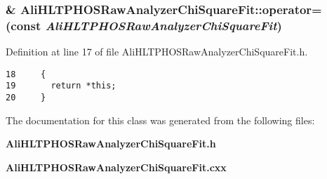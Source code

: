 \subsubsection{\& Ali\-HLTPHOSRaw\-Analyzer\-Chi\-Square\-Fit::operator= (const  {\em Ali\-HLTPHOSRaw\-Analyzer\-Chi\-Square\-Fit})\hspace{0.3cm}{\tt  [inline]}}\label{classAliHLTPHOSRawAnalyzerChiSquareFit_a2}




Definition at line 17 of file Ali\-HLTPHOSRaw\-Analyzer\-Chi\-Square\-Fit.h.

\footnotesize\begin{verbatim}18     {
19       return *this; 
20     }
\end{verbatim}\normalsize 




The documentation for this class was generated from the following files:\begin{CompactItemize}
\item 
{\bf Ali\-HLTPHOSRaw\-Analyzer\-Chi\-Square\-Fit.h}\item 
{\bf Ali\-HLTPHOSRaw\-Analyzer\-Chi\-Square\-Fit.cxx}\end{CompactItemize}
